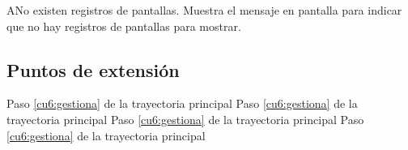  \begin{UCtrayectoriaA}{A}{No existen registros de pantallas.}
    \UCpaso[\UCsist] Muestra el mensaje  en pantalla  
    para indicar que no hay registros de pantallas para mostrar.
 \end{UCtrayectoriaA}
 

\subsection{Puntos de extensión}

	{Paso \ref{cu6:gestiona} de la trayectoria principal}
	{}
	{Paso \ref{cu6:gestiona} de la trayectoria principal}
	{}	
	{Paso \ref{cu6:gestiona} de la trayectoria principal}
	{}
	{Paso \ref{cu6:gestiona} de la trayectoria principal}
	{}